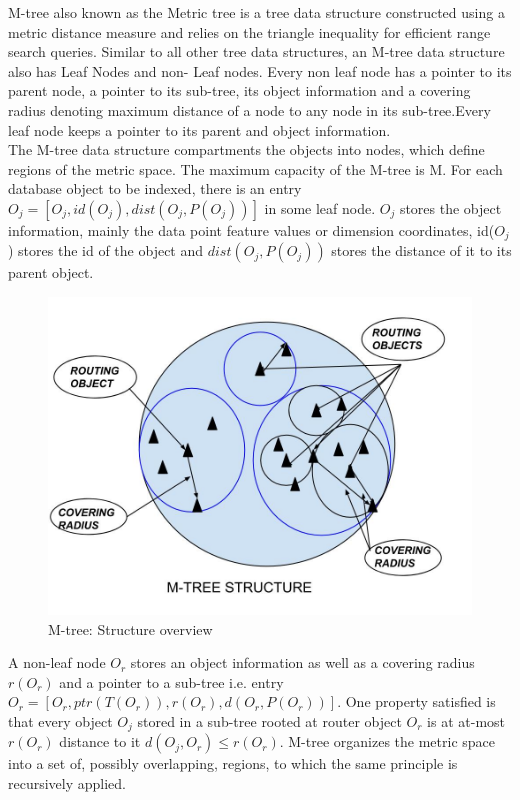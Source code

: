 

M-tree also known as the Metric tree is a tree data structure constructed using a metric distance measure and relies on the triangle inequality for efficient range search queries. Similar to all other tree data structures, an M-tree data structure also has Leaf Nodes and non- Leaf nodes. Every non leaf node has a pointer to its parent node, a pointer to its sub-tree, its object information and a covering radius denoting maximum distance of a node to any node in its sub-tree.Every leaf node keeps a pointer to its parent and object information.\\

The M-tree data structure compartments the objects into nodes, which define regions of the metric space. The maximum capacity of the M-tree is M. For each database object to be indexed, there is an entry $O_j = [ O_j, id(O_j), dist(O_j , P(O_j )) ]$
in some leaf node.  $O_j$ stores the object information, mainly the data point feature values or dimension coordinates, id($O_j$) stores the id of the object and $dist(O_j , P(O_j ))$ stores the distance of it to its parent object. \\

\begin{figure}[ht]	
\centering
\includegraphics[width=0.7 \columnwidth]{img/mtree.jpg}
\caption{M-tree: Structure overview}
\label{fig:4.0}
\end{figure}

A non-leaf node $O_r$ stores an object information as well as a covering radius $r(O_r)$ and a pointer to a sub-tree i.e. entry $O_r=[ O_r, ptr(T(O_r)), r(O_r), d(O_r, P(O_r)) ]$. One property satisfied is that every object $O_j$ stored in a sub-tree rooted at router object $O_r$ is at at-most $r(O_r)$ distance to it $d(O_j , O_r) ≤ r(O_r)$. M-tree organizes the metric space into a set of, possibly overlapping, regions, to which the same principle is recursively applied.\\




